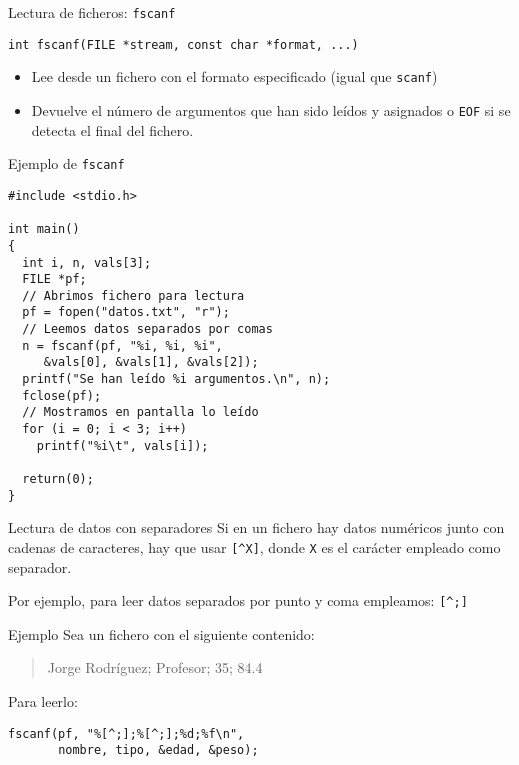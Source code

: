 \documentclass[usenames,svgnames,dvipsnames, aspectratio=169]{beamer}
\begin{document}
\begin{frame}[label={sec:org40d0326},fragile]{Lectura de ficheros: \texttt{fscanf}}
 \lstset{language=C,label= ,caption= ,captionpos=b,numbers=none}
\begin{lstlisting}
int fscanf(FILE *stream, const char *format, ...)
\end{lstlisting}

\begin{itemize}
\item Lee desde un fichero con el formato especificado (\alert{igual que \texttt{scanf}})

\item Devuelve el número de argumentos que han sido leídos y asignados o \texttt{EOF} si se detecta el final del fichero.
\end{itemize}
\end{frame}


\begin{frame}[label={sec:org92414cb},fragile,plain]{Ejemplo de \texttt{fscanf}}
 \lstset{language=C,label= ,caption= ,captionpos=b,numbers=none}
\begin{lstlisting}
#include <stdio.h>

int main()
{
  int i, n, vals[3];
  FILE *pf;
  // Abrimos fichero para lectura
  pf = fopen("datos.txt", "r");
  // Leemos datos separados por comas
  n = fscanf(pf, "%i, %i, %i",
	 &vals[0], &vals[1], &vals[2]);
  printf("Se han leído %i argumentos.\n", n);
  fclose(pf);
  // Mostramos en pantalla lo leído
  for (i = 0; i < 3; i++)
    printf("%i\t", vals[i]);

  return(0);
}
\end{lstlisting}
\end{frame}



\begin{frame}[label={sec:org5b983e3},fragile]{Lectura de datos con separadores}
 Si en un fichero hay datos numéricos junto con cadenas de caracteres, hay que usar \texttt{[\textasciicircum{}X]}, donde \texttt{X} es el carácter empleado como separador. 

Por ejemplo, para leer datos separados por punto y coma empleamos: \texttt{[\textasciicircum{};]}

\begin{block}{Ejemplo}
Sea un fichero con el siguiente contenido:
\begin{quote}
Jorge Rodríguez; Profesor; 35; 84.4
\end{quote}

Para leerlo:
\lstset{language=C,label= ,caption= ,captionpos=b,numbers=none}
\begin{lstlisting}
fscanf(pf, "%[^;];%[^;];%d;%f\n",
       nombre, tipo, &edad, &peso);
\end{lstlisting}
\end{block}
\end{frame}
\end{document}

